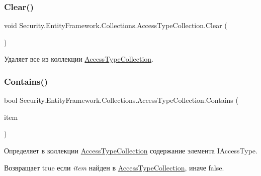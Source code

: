 \subsubsection{\texorpdfstring{Clear()}{Clear()}}
{\footnotesize\ttfamily void Security.\+Entity\+Framework.\+Collections.\+Access\+Type\+Collection.\+Clear (\begin{DoxyParamCaption}{ }\end{DoxyParamCaption})}



Удаляет все из коллекции \hyperlink{class_security_1_1_entity_framework_1_1_collections_1_1_access_type_collection}{Access\+Type\+Collection}. 

\mbox{\label{class_security_1_1_entity_framework_1_1_collections_1_1_access_type_collection_a759dff7eef80475a7649cc0ef25a7532}} 
\subsubsection{\texorpdfstring{Contains()}{Contains()}}
{\footnotesize\ttfamily bool Security.\+Entity\+Framework.\+Collections.\+Access\+Type\+Collection.\+Contains (\begin{DoxyParamCaption}\item[{\hyperlink{interface_security_1_1_interfaces_1_1_model_1_1_i_access_type}{I\+Access\+Type}}]{item }\end{DoxyParamCaption})}



Определяет в коллекции \hyperlink{class_security_1_1_entity_framework_1_1_collections_1_1_access_type_collection}{Access\+Type\+Collection} содержание элемента I\+Access\+Type. 

\begin{DoxyReturn}{Возвращает}
true если {\itshape item}  найден в \hyperlink{class_security_1_1_entity_framework_1_1_collections_1_1_access_type_collection}{Access\+Type\+Collection}, иначе false. 
\end{DoxyReturn}

